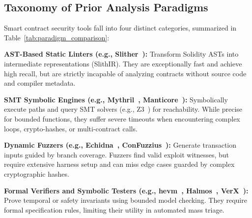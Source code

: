 \documentclass[conference]{IEEEtran}
\begin{document}
\subsection{Taxonomy of Prior Analysis Paradigms}
Smart contract security tools fall into four distinct categories, summarized in Table~\ref{tab:paradigm_comparison}:

\smallskip
\noindent\textbf{AST-Based Static Linters (e.g., Slither~\cite{feist2019slither}):} Transform Solidity ASTs into intermediate representations (SlithIR). They are exceptionally fast and achieve high recall, but are strictly incapable of analyzing contracts without source code and compiler metadata.

\smallskip
\noindent\textbf{SMT Symbolic Engines (e.g., Mythril~\cite{mueller2018mythril}, Manticore~\cite{mossberg2019manticore}):} Symbolically execute paths and query SMT solvers (e.g., Z3~\cite{de2008z3}) for reachability. While precise for bounded functions, they suffer severe timeouts when encountering complex loops, crypto-hashes, or multi-contract calls.

\smallskip
\noindent\textbf{Dynamic Fuzzers (e.g., Echidna~\cite{grieco2020echidna}, ConFuzzius~\cite{torres2021confuzzius}):} Generate transaction inputs guided by branch coverage. Fuzzers find valid exploit witnesses, but require extensive harness setup and can miss edge cases guarded by complex cryptographic hashes.

\smallskip
\noindent\textbf{Formal Verifiers and Symbolic Testers (e.g., hevm~\cite{dxo2024hevm}, Halmos~\cite{a16z2023halmos}, VerX~\cite{permenev2020verx}):} Prove temporal or safety invariants using bounded model checking. They require formal specification rules, limiting their utility in automated mass triage.
\end{document}
